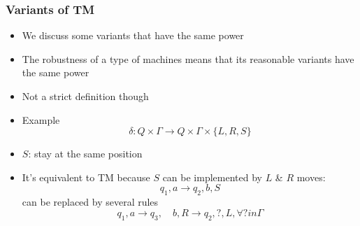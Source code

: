 




\begin{frame}[allowframebreaks] \frametitle{Variants of TM}
  \begin{itemize}
\item We discuss some variants that have the same power

\item
  The robustness of a type of machines means that its reasonable
variants have the same 
power

\item
  [] Not a strict definition though

\item Example
  \begin{equation*}
\delta: Q \times \Gamma\rightarrow Q \times \Gamma 
\times \{L, R, S\}
\end{equation*}
\item
  [] $S$: stay at the same position

\item
  It's equivalent to TM because $S$ can
  be implemented by $L$ \& $R$ moves:
  \begin{equation*}
      q_1,a \rightarrow q_2,b, S
    \end{equation*}
    can be replaced by several rules
    \begin{equation*}
q_1,a \rightarrow q_3, \quad b,R \rightarrow
q_2, ?, L, \forall ? in \Gamma 
\end{equation*}
\end{itemize}
\end{frame}

